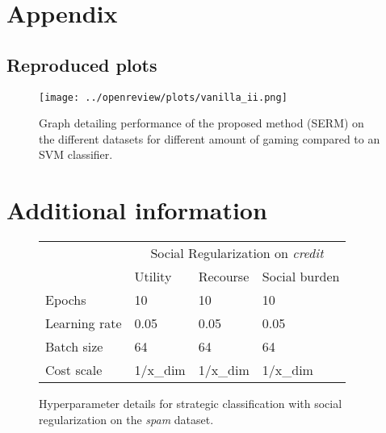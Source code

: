 \newpage
\section*{Appendix}
\subsection{Reproduced plots}\label{app:plots}
\begin{figure}[H]
    \centering
    \texttt{[image: ../openreview/plots/vanilla\_ii.png]}
    \caption{Graph detailing performance of the proposed method (SERM) on the different datasets for different amount of gaming compared to an SVM classifier.}
    \label{fig:vanilla_II}
\end{figure}
\section{Additional information}
\begin{figure}[H]
    \centering
    \begin{tabular}{l|lll|}
    \cline{2-4}
                                        & \multicolumn{3}{c|}{Social Regularization on \textit{credit}}                            \\ \cline{2-4} 
                                        & \multicolumn{1}{l|}{Utility}  & \multicolumn{1}{l|}{Recourse} & Social burden \\ \hline
    \multicolumn{1}{|l|}{Epochs}        & \multicolumn{1}{l|}{10}       & \multicolumn{1}{l|}{10}       & 10            \\ \hline
    \multicolumn{1}{|l|}{Learning rate} & \multicolumn{1}{l|}{0.05}     & \multicolumn{1}{l|}{0.05}     & 0.05          \\ \hline
    \multicolumn{1}{|l|}{Batch size}    & \multicolumn{1}{l|}{64}       & \multicolumn{1}{l|}{64}       & 64            \\ \hline
    \multicolumn{1}{|l|}{Cost scale}         & \multicolumn{1}{l|}{1/x\_dim} & \multicolumn{1}{l|}{1/x\_dim} & 1/x\_dim      \\ \hline
\end{tabular}
    \caption{Hyperparameter details for strategic classification with social regularization on the \textit{spam} dataset.}
    \label{tab:hyperparams_reg}
\end{figure}
